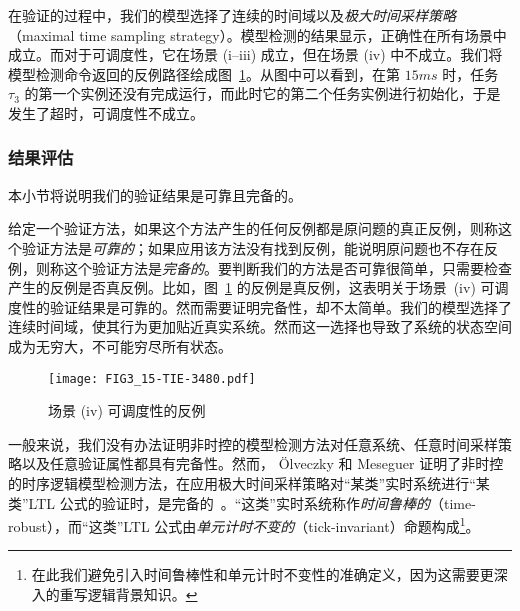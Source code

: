 在验证的过程中，我们的模型选择了连续的时间域以及\emph{极大时间采样策略}（maximal time sampling strategy）。模型检测的结果显示，正确性在所有场景中成立。而对于可调度性，它在场景 (i--iii) 成立，但在场景 (iv) 中不成立。我们将模型检测命令返回的反例路径绘成图~\ref{f:counterexample}。从图中可以看到，在第 $15ms$ 时，任务 $\tau_3$ 的第一个实例还没有完成运行，而此时它的第二个任务实例进行初始化，于是发生了超时，可调度性不成立。


\subsubsection{结果评估}
本小节将说明我们的验证结果是可靠且完备的。

给定一个验证方法，如果这个方法产生的任何反例都是原问题的真正反例，则称这个验证方法是\emph{可靠的}；如果应用该方法没有找到反例，能说明原问题也不存在反例，则称这个验证方法是\emph{完备的}。要判断我们的方法是否可靠很简单，只需要检查产生的反例是否真反例。比如，图~\ref{f:counterexample} 的反例是真反例，这表明关于场景~(iv) 可调度性的验证结果是可靠的。然而需要证明完备性，却不太简单。我们的模型选择了连续时间域，使其行为更加贴近真实系统。然而这一选择也导致了系统的状态空间成为无穷大，不可能穷尽所有状态。

\begin{landscape}
\begin{figure}[t]
\centering 
\texttt{[image: FIG3\_15-TIE-3480.pdf]}
\caption{场景 (iv) 可调度性的反例}
\label{f:counterexample}
\end{figure}
\end{landscape}

一般来说，我们没有办法证明非时控的模型检测方法对任意系统、任意时间采样策略以及任意验证属性都具有完备性。然而， \"Olveczky 和 Meseguer 证明了非时控的时序逻辑模型检测方法，在应用极大时间采样策略对“某类”实时系统进行“某类”LTL 公式的验证时，是完备的~\cite{DBLP:journals/entcs/OlveczkyM07a}。“这类”实时系统称作\emph{时间鲁棒的}（time-robust），而“这类”LTL 公式由\emph{单元计时不变的}（tick-invariant）命题构成\footnote{在此我们避免引入时间鲁棒性和单元计时不变性的准确定义，因为这需要更深入的重写逻辑背景知识。}。

